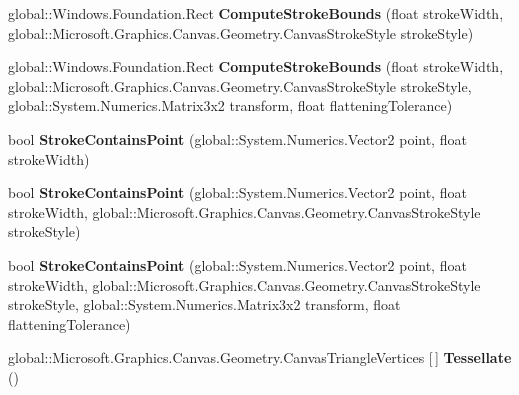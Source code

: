 \begin{DoxyCompactItemize}
global\+::\+Windows.\+Foundation.\+Rect {\bfseries Compute\+Stroke\+Bounds} (float stroke\+Width, global\+::\+Microsoft.\+Graphics.\+Canvas.\+Geometry.\+Canvas\+Stroke\+Style stroke\+Style)
\item 
\mbox{\label{class_microsoft_1_1_graphics_1_1_canvas_1_1_geometry_1_1_canvas_geometry_a2587e2485f5e40dce3e189b1e840c170}} 
global\+::\+Windows.\+Foundation.\+Rect {\bfseries Compute\+Stroke\+Bounds} (float stroke\+Width, global\+::\+Microsoft.\+Graphics.\+Canvas.\+Geometry.\+Canvas\+Stroke\+Style stroke\+Style, global\+::\+System.\+Numerics.\+Matrix3x2 transform, float flattening\+Tolerance)
\item 
\mbox{\label{class_microsoft_1_1_graphics_1_1_canvas_1_1_geometry_1_1_canvas_geometry_a487c9868385c05d9028ba59b0663e9f3}} 
bool {\bfseries Stroke\+Contains\+Point} (global\+::\+System.\+Numerics.\+Vector2 point, float stroke\+Width)
\item 
\mbox{\label{class_microsoft_1_1_graphics_1_1_canvas_1_1_geometry_1_1_canvas_geometry_add386d8e31ab0caf7b1b42d94e038fcd}} 
bool {\bfseries Stroke\+Contains\+Point} (global\+::\+System.\+Numerics.\+Vector2 point, float stroke\+Width, global\+::\+Microsoft.\+Graphics.\+Canvas.\+Geometry.\+Canvas\+Stroke\+Style stroke\+Style)
\item 
\mbox{\label{class_microsoft_1_1_graphics_1_1_canvas_1_1_geometry_1_1_canvas_geometry_a41adeb9ece02222f6a21e9635da34d5b}} 
bool {\bfseries Stroke\+Contains\+Point} (global\+::\+System.\+Numerics.\+Vector2 point, float stroke\+Width, global\+::\+Microsoft.\+Graphics.\+Canvas.\+Geometry.\+Canvas\+Stroke\+Style stroke\+Style, global\+::\+System.\+Numerics.\+Matrix3x2 transform, float flattening\+Tolerance)
\item 
\mbox{\label{class_microsoft_1_1_graphics_1_1_canvas_1_1_geometry_1_1_canvas_geometry_a0a66062ad10deeea0d4c354fa37dd1e5}} 
global\+::\+Microsoft.\+Graphics.\+Canvas.\+Geometry.\+Canvas\+Triangle\+Vertices \mbox{[}$\,$\mbox{]} {\bfseries Tessellate} ()

\end{DoxyCompactItemize}
